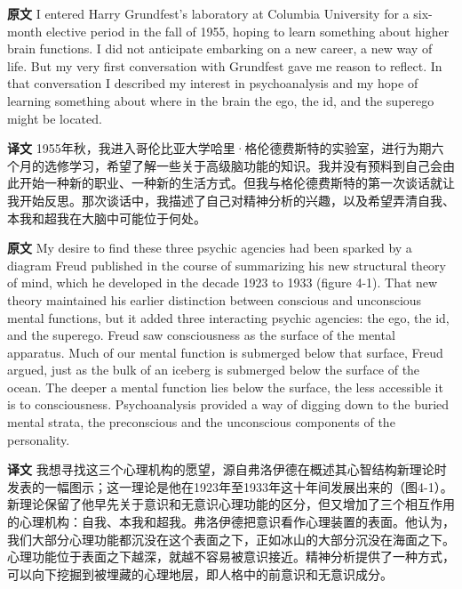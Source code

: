 \documentclass[UTF8]{ctexart}
\newenvironment{english}{\par\small\noindent\textbf{原文}\quad\ignorespaces}{\par}
\newenvironment{zhtranslation}{\par\noindent\textbf{译文}\quad\ignorespaces}{\par\vspace{0.35em}}
\begin{document}
\begin{english}
I entered Harry Grundfest's laboratory at Columbia University for a six-month elective period in the fall of 1955, hoping to learn something about higher brain functions. I did not anticipate embarking on a new career, a new way of life. But my very first conversation with Grundfest gave me reason to reflect. In that conversation I described my interest in psychoanalysis and my hope of learning something about where in the brain the ego, the id, and the superego might be located.
\end{english}
\begin{zhtranslation}
1955年秋，我进入哥伦比亚大学哈里·格伦德费斯特的实验室，进行为期六个月的选修学习，希望了解一些关于高级脑功能的知识。我并没有预料到自己会由此开始一种新的职业、一种新的生活方式。但我与格伦德费斯特的第一次谈话就让我开始反思。那次谈话中，我描述了自己对精神分析的兴趣，以及希望弄清自我、本我和超我在大脑中可能位于何处。\end{zhtranslation}

\begin{english}
My desire to find these three psychic agencies had been sparked by a diagram Freud published in the course of summarizing his new structural theory of mind, which he developed in the decade 1923 to 1933 (figure 4-1). That new theory maintained his earlier distinction between conscious and unconscious mental functions, but it added three interacting psychic agencies: the ego, the id, and the superego. Freud saw consciousness as the surface of the mental apparatus. Much of our mental function is submerged below that surface, Freud argued, just as the bulk of an iceberg is submerged below the surface of the ocean. The deeper a mental function lies below the surface, the less accessible it is to consciousness. Psychoanalysis provided a way of digging down to the buried mental strata, the preconscious and the unconscious components of the personality.
\end{english}
\begin{zhtranslation}
我想寻找这三个心理机构的愿望，源自弗洛伊德在概述其心智结构新理论时发表的一幅图示；这一理论是他在1923年至1933年这十年间发展出来的（图4-1）。新理论保留了他早先关于意识和无意识心理功能的区分，但又增加了三个相互作用的心理机构：自我、本我和超我。弗洛伊德把意识看作心理装置的表面。他认为，我们大部分心理功能都沉没在这个表面之下，正如冰山的大部分沉没在海面之下。心理功能位于表面之下越深，就越不容易被意识接近。精神分析提供了一种方式，可以向下挖掘到被埋藏的心理地层，即人格中的前意识和无意识成分。\end{zhtranslation}
\end{document}
